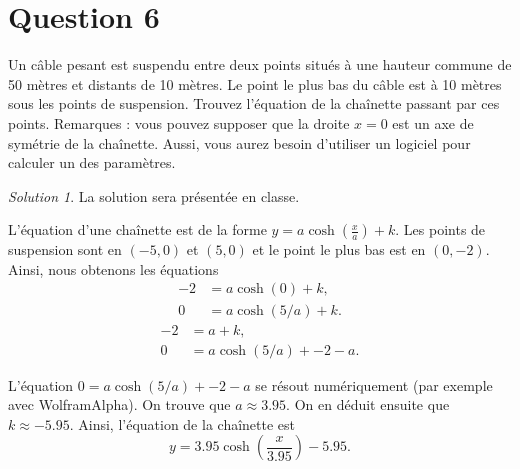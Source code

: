 \documentclass[
  12pt,
  letterpaper,
]{book}
\theoremstyle{remark}
\newtheorem*{solution}{Solution}
\begin{document}
\hypertarget{question-6-3}{%
\section{Question 6}\label{question-6-3}}

Un câble pesant est suspendu entre deux points situés à une hauteur
commune de 50 mètres et distants de 10 mètres. Le point le plus bas du
câble est à 10 mètres sous les points de suspension. Trouvez l'équation
de la chaînette passant par ces points. Remarques : vous pouvez supposer
que la droite \(x=0\) est un axe de symétrie de la chaînette. Aussi,
vous aurez besoin d'utiliser un logiciel pour calculer un des
paramètres.

\begin{solution}

La solution sera présentée en classe.

\end{solution}

L'équation d'une chaînette est de la forme
\(y = a \cosh(\frac{x}{a}) + k\). Les points de suspension sont en
\((-5,0)\) et \((5,0)\) et le point le plus bas est en \((0,-2)\).
Ainsi, nous obtenons les équations \begin{align}
-2 &= a \cosh(0) + k,\\
0 &= a \cosh(5/a) + k.
\end{align} \begin{align}
-2 &= a + k,\\
0 &= a \cosh(5/a) + -2-a.
\end{align}

L'équation \(0 = a \cosh(5/a) + -2-a\) se résout numériquement (par
exemple avec WolframAlpha). On trouve que \(a \approx 3.95\). On en
déduit ensuite que \(k\approx -5.95\). Ainsi, l'équation de la chaînette
est \[y = 3.95 \cosh\left(\frac{x}{3.95}\right) - 5.95.\]
\end{document}
